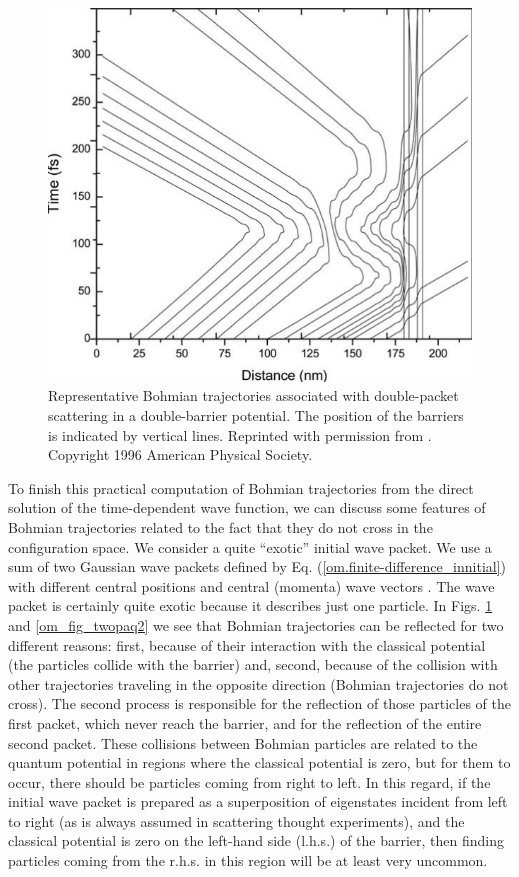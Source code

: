 \documentclass[nofootinbib, secnumarabic, amsmath, nobibnotes,10pt,aps,pra]{revtex4-1}
\newcommand{\eref}[1]{Eq. (\ref{#1})}
\begin{document}
\begin{figure}
\centering
\includegraphics{F1_A1.pdf}
\caption{Representative Bohmian trajectories associated with double-packet scattering in a double-barrier potential. The position of the barriers is indicated by vertical lines. Reprinted with permission from \cite{om.oriolstime}. Copyright 1996 American Physical Society.}
\label{om_fig_twopaq1}
\end{figure}

To finish this practical computation of Bohmian trajectories from
the direct solution of the time-dependent wave function, we can
discuss some features of Bohmian trajectories related to the fact
that they do not cross in the configuration space. We consider a
quite ``exotic'' initial wave packet. We use a sum of two Gaussian
wave packets defined by \eref{om.finite-difference_innitial} with different central
positions and central (momenta) wave vectors \cite{om.oriolstime}.
The wave packet is certainly quite exotic because it describes just
one particle. In Figs. \ref{om_fig_twopaq1} and \ref{om_fig_twopaq2} we
see that Bohmian trajectories can be reflected for two different
reasons: first, because of their interaction with the classical
potential (the particles collide with the barrier) and, second,
because of the collision with other trajectories traveling in the
opposite direction (Bohmian trajectories do not cross). The second
process is responsible for the reflection of those particles of the
first packet, which never reach the barrier, and for the reflection
of the entire second packet. These collisions between Bohmian
particles are related to the quantum  potential
in regions where the classical potential is zero, but for them to
occur, there should be particles coming from right to left. In this
regard, if the initial wave packet is prepared as a superposition of
eigenstates incident from left to right (as is always assumed in
scattering thought experiments), and the classical potential is zero
on the left-hand side (l.h.s.) of the barrier, then finding
particles coming from the r.h.s. in this region will be at least
very uncommon.
\end{document}

